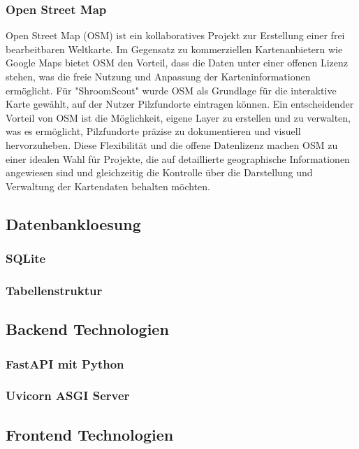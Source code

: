 \documentclass[../main.tex]{subfiles}
\begin{document}
\subsubsection{Open Street Map}
Open Street Map (OSM) ist ein kollaboratives Projekt zur Erstellung einer frei bearbeitbaren Weltkarte. Im Gegensatz zu kommerziellen 
Kartenanbietern wie Google Maps bietet OSM den Vorteil, dass die Daten unter einer offenen Lizenz stehen, was die freie Nutzung und 
Anpassung der Karteninformationen ermöglicht. Für "ShroomScout" wurde OSM als Grundlage für die interaktive Karte gewählt, auf der Nutzer 
Pilzfundorte eintragen können. Ein entscheidender Vorteil von OSM ist die Möglichkeit, eigene Layer zu erstellen und zu verwalten, was es 
ermöglicht, Pilzfundorte präzise zu dokumentieren und visuell hervorzuheben. Diese Flexibilität und die offene Datenlizenz machen OSM zu 
einer idealen Wahl für Projekte, die auf detaillierte geographische Informationen angewiesen sind und gleichzeitig die Kontrolle über die 
Darstellung und Verwaltung der Kartendaten behalten möchten.

\subsection{Datenbankloesung} %
\subsubsection{SQLite}
\subsubsection{Tabellenstruktur}

\subsection{Backend Technologien} %
\subsubsection{FastAPI mit Python}
\subsubsection{Uvicorn ASGI Server}

\subsection{Frontend Technologien} %
\end{document}
